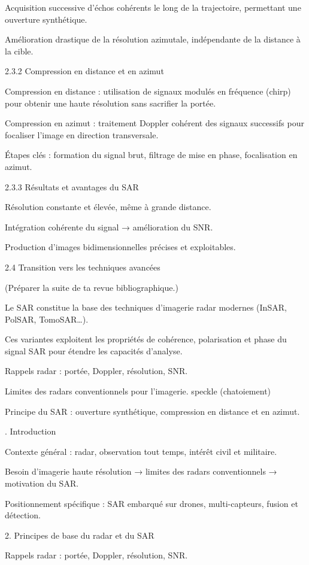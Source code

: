 Acquisition successive d’échos cohérents le long de la trajectoire, permettant une ouverture synthétique.

Amélioration drastique de la résolution azimutale, indépendante de la distance à la cible.

2.3.2 Compression en distance et en azimut

Compression en distance : utilisation de signaux modulés en fréquence (chirp) pour obtenir une haute résolution sans sacrifier la portée.

Compression en azimut : traitement Doppler cohérent des signaux successifs pour focaliser l’image en direction transversale.

Étapes clés : formation du signal brut, filtrage de mise en phase, focalisation en azimut.

2.3.3 Résultats et avantages du SAR

Résolution constante et élevée, même à grande distance.

Intégration cohérente du signal → amélioration du SNR.

Production d’images bidimensionnelles précises et exploitables.

2.4 Transition vers les techniques avancées

(Préparer la suite de ta revue bibliographique.)

Le SAR constitue la base des techniques d’imagerie radar modernes (InSAR, PolSAR, TomoSAR…).

Ces variantes exploitent les propriétés de cohérence, polarisation et phase du signal SAR pour étendre les capacités d’analyse.

Rappels radar : portée, Doppler, résolution, SNR.

Limites des radars conventionnels pour l’imagerie.
speckle (chatoiement) 

Principe du SAR : ouverture synthétique, compression en distance et en azimut.




. Introduction

Contexte général : radar, observation tout temps, intérêt civil et militaire.

Besoin d’imagerie haute résolution → limites des radars conventionnels → motivation du SAR.

Positionnement spécifique : SAR embarqué sur drones, multi-capteurs, fusion et détection.

2. Principes de base du radar et du SAR

Rappels radar : portée, Doppler, résolution, SNR.

